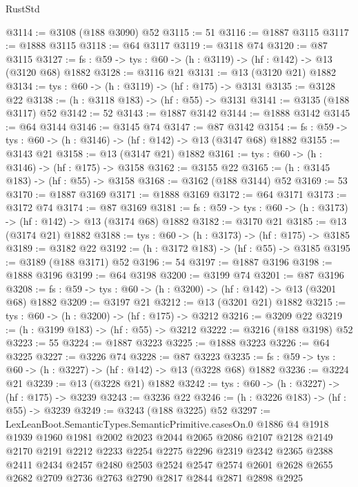\begin{lexlean}{RustStd}
\begin{coremodule}
@3114 := @3108 (@188 @3090) @52
@3115 := 51
@3116 := @1887 @3115
@3117 := @1888 @3115
@3118 := @64 @3117
@3119 := @3118 @74
@3120 := @87 @3115
@3127 := {fs : @59} -> {tys : @60} -> (h : @3119) -> (hf : @142) -> @13 (@3120 @68) @1882
@3128 := @3116 @21
@3131 := @13 (@3120 @21) @1882
@3134 := {tys : @60} -> (h : @3119) -> (hf : @175) -> @3131
@3135 := @3128 @22
@3138 := (h : @3118 @183) -> (hf : @55) -> @3131
@3141 := @3135 (@188 @3117) @52
@3142 := 52
@3143 := @1887 @3142
@3144 := @1888 @3142
@3145 := @64 @3144
@3146 := @3145 @74
@3147 := @87 @3142
@3154 := {fs : @59} -> {tys : @60} -> (h : @3146) -> (hf : @142) -> @13 (@3147 @68) @1882
@3155 := @3143 @21
@3158 := @13 (@3147 @21) @1882
@3161 := {tys : @60} -> (h : @3146) -> (hf : @175) -> @3158
@3162 := @3155 @22
@3165 := (h : @3145 @183) -> (hf : @55) -> @3158
@3168 := @3162 (@188 @3144) @52
@3169 := 53
@3170 := @1887 @3169
@3171 := @1888 @3169
@3172 := @64 @3171
@3173 := @3172 @74
@3174 := @87 @3169
@3181 := {fs : @59} -> {tys : @60} -> (h : @3173) -> (hf : @142) -> @13 (@3174 @68) @1882
@3182 := @3170 @21
@3185 := @13 (@3174 @21) @1882
@3188 := {tys : @60} -> (h : @3173) -> (hf : @175) -> @3185
@3189 := @3182 @22
@3192 := (h : @3172 @183) -> (hf : @55) -> @3185
@3195 := @3189 (@188 @3171) @52
@3196 := 54
@3197 := @1887 @3196
@3198 := @1888 @3196
@3199 := @64 @3198
@3200 := @3199 @74
@3201 := @87 @3196
@3208 := {fs : @59} -> {tys : @60} -> (h : @3200) -> (hf : @142) -> @13 (@3201 @68) @1882
@3209 := @3197 @21
@3212 := @13 (@3201 @21) @1882
@3215 := {tys : @60} -> (h : @3200) -> (hf : @175) -> @3212
@3216 := @3209 @22
@3219 := (h : @3199 @183) -> (hf : @55) -> @3212
@3222 := @3216 (@188 @3198) @52
@3223 := 55
@3224 := @1887 @3223
@3225 := @1888 @3223
@3226 := @64 @3225
@3227 := @3226 @74
@3228 := @87 @3223
@3235 := {fs : @59} -> {tys : @60} -> (h : @3227) -> (hf : @142) -> @13 (@3228 @68) @1882
@3236 := @3224 @21
@3239 := @13 (@3228 @21) @1882
@3242 := {tys : @60} -> (h : @3227) -> (hf : @175) -> @3239
@3243 := @3236 @22
@3246 := (h : @3226 @183) -> (hf : @55) -> @3239
@3249 := @3243 (@188 @3225) @52
@3297 := LexLeanBoot.SemanticTypes.SemanticPrimitive.casesOn.{0}
    @1886
    @4
    @1918
    @1939
    @1960
    @1981
    @2002
    @2023
    @2044
    @2065
    @2086
    @2107
    @2128
    @2149
    @2170
    @2191
    @2212
    @2233
    @2254
    @2275
    @2296
    @2319
    @2342
    @2365
    @2388
    @2411
    @2434
    @2457
    @2480
    @2503
    @2524
    @2547
    @2574
    @2601
    @2628
    @2655
    @2682
    @2709
    @2736
    @2763
    @2790
    @2817
    @2844
    @2871
    @2898
    @2925

\end{coremodule}
\end{lexlean}
